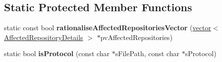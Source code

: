 \subsection*{\-Static \-Protected \-Member \-Functions}
\begin{DoxyCompactItemize}
\item 
\hypertarget{classgeneral__server_1_1Repository_a109d261edae3b1cdde71de7373c6cb90}{static const bool {\bfseries rationalise\-Affected\-Repositories\-Vector} (\hyperlink{classvector}{vector}$<$ \hyperlink{structgeneral__server_1_1Repository_1_1AffectedRepositoryDetails}{\-Affected\-Repository\-Details} $>$ $\ast$pv\-Affected\-Repositories)}\label{classgeneral__server_1_1Repository_a109d261edae3b1cdde71de7373c6cb90}

\item 
\hypertarget{classgeneral__server_1_1Repository_a1bfdd0cf5f081ba1583ff5a09e70dc0b}{static bool {\bfseries is\-Protocol} (const char $\ast$s\-File\-Path, const char $\ast$s\-Protocol)}\label{classgeneral__server_1_1Repository_a1bfdd0cf5f081ba1583ff5a09e70dc0b}

\end{DoxyCompactItemize}
